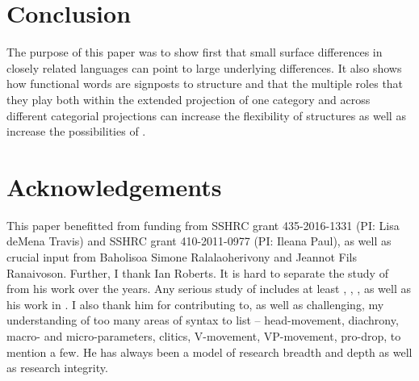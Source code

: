 \documentclass[output=paper]{langsci/langscibook}
\begin{document}
\section{Conclusion}

The purpose of this paper was to show first that small surface differences in
closely related languages can point to large underlying differences.  It also
shows how  functional words are signposts to structure and that the multiple
roles that they play both within the extended projection of one category and
across different categorial projections can increase the flexibility of
structures as well as increase the possibilities of .

\printchapterglossary{}

\section*{Acknowledgements}

This paper benefitted from funding from SSHRC grant 435-2016-1331 (PI:
Lisa deMena Travis) and SSHRC grant 410-2011-0977 (PI: Ileana Paul), as well as crucial
input from Baholisoa Simone Ralalaoherivony and Jeannot Fils Ranaivoson.
Further, I thank Ian Roberts.  It is hard to separate the study of 
from his work over the years.  Any serious study of  includes at
least \textcite{Biberauer:2016}, \textcite{RobHol2005},
\textcite{Roberts:2014}, as well as his work in \textcite{Roberts1993}.  I also
thank him for contributing to, as well as challenging, my understanding of too
many areas of syntax to list -- head-movement, diachrony, macro- and
micro-parameters, clitics, V-movement, VP-movement, pro-drop, to mention a few.
He has always been a model of research breadth and depth as well as research
integrity.

{\sloppy
\printbibliography[heading=subbibliography,notkeyword=this]
}
\end{document}
